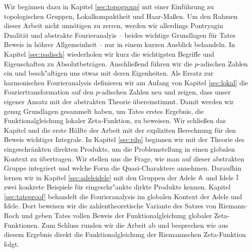 	Wir beginnen dazu in Kapitel \ref{sec:topogroup} mit einer Einführung zu topologischen Gruppen, Lokalkompaktheit und Haar-Maßen.
	Um den Rahmen dieser Arbeit nicht unnötigen zu zerren, werden wir allerdings Pontryagin Dualität und abstrakte Fourieranalyis -- beides wichtige Grundlagen für Tates Beweis in höhrer Allgemeinheit -- nur in einem kurzen Ausblick behandeln.
	In Kapitel \ref{sec:padisch} wiederholen wir kurz die wichtigsten Begriffe und Eigenschaften zu Absolutbeträgen. 
	Anschließend führen wir die $p$-adischen Zahlen ein und besch"aftigen uns etwas mit deren Eigenheiten.
	Als Ersatz zur harmonischen Fourieranalysis definieren wir am Anfang von Kapitel \ref{sec:lokal} die Fouriertransformation auf den $p$-adischen Zahlen neu und zeigen, dass unser eigener Ansatz mit der abstrakten Theorie übereinstimmt. 
	Damit werden wir genug Grundlagen gesammelt haben, um Tates erstes Ergebnis, die Funktionalgleichung lokaler Zeta-Funktion, zu beweisen.
	Wir schließen das Kapitel und die erste Hälfte der Arbeit mit der expliziten Berechnung für den Beweis wichtiger Integrale.
	In Kapitel \ref{sec:rdp} beginnen wir mit der Theorie des eingeschränkten direkten Produkts, um die Problemstellung in einen globalen Kontext zu übertragen.
	Wir stellen uns die Frage, wie man auf dieser abstrakten Gruppe integriert und welche Form die Quasi-Charaktere annehmen.
	Daraufhin lernen wir in Kapitel \ref{sec:adeleidele} mit den Gruppen der Adele $\mathbb{A}$ und Idele $\mathbb{I}$ zwei konkrete Beispiele für eingeschr"ankte dirkte Produkte kennen.
	Kapitel \ref{sec:tateproof} behandelt die Fourieranalysis im globalen Kontext der Adele und Idele. 
	Dort beweisen wir die zahlentheoretische Variante des Satzes von Riemann-Roch und geben Tates vollen Beweis der Funktionalgleichung globaler Zeta-Funktionen. 
	Zum Schluss runden wir die Arbeit ab und besprechen wie aus diesem Ergebnis direkt die Funktionalgleichung der Riemannschen Zeta-Funktion folgt.